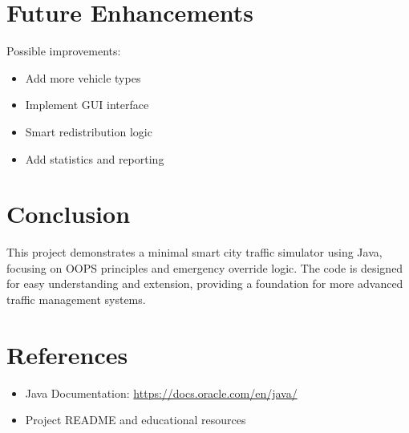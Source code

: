 \documentclass[12pt,a4paper]{article}
\begin{document}
\section{Future Enhancements}
Possible improvements:
\begin{itemize}
    \item Add more vehicle types
    \item Implement GUI interface
    \item Smart redistribution logic
    \item Add statistics and reporting
\end{itemize}

\section{Conclusion}
This project demonstrates a minimal smart city traffic simulator using Java, focusing on OOPS principles and emergency override logic. The code is designed for easy understanding and extension, providing a foundation for more advanced traffic management systems.

\newpage

\section{References}
\begin{itemize}
    \item [1] Java Documentation: \url{https://docs.oracle.com/en/java/}
    \item [2] Project README and educational resources
\end{itemize}
\end{document}
